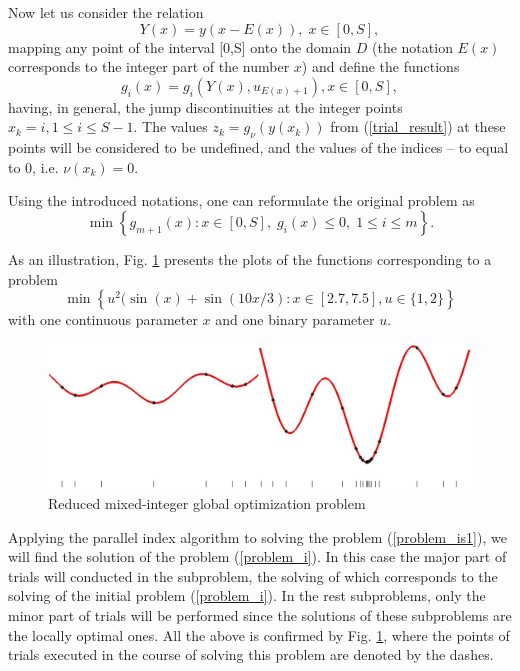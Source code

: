 \documentclass{llncs}
\begin{document}
Now let us consider the relation 
\[
Y(x)=y(x-E(x)), \; x\in[0,S],
\]
mapping any point of the interval [0,S] onto the domain $D$ (the notation $E(x)$ corresponds 
to the integer part of the number $x$) and define the functions 
\[
g_i(x) = g_i(Y(x),u_{E(x)+1}), x\in[0,S],
\]
having, in general, the jump discontinuities at the integer points $x_k = i, 1\leq i \leq 
S-1$.
The values $z_k = g_\nu(y(x_k))$ from (\ref{trial_result}) at these points will be considered to 
be undefined, and the values of the indices -- to equal to 0, i.e. $\nu(x_k) = 0$.

Using the introduced notations, one can reformulate the original problem as
\begin{equation}\label{problem_is1}
\min \left\{g_{m+1}(x): x \in [0,S], \; g_i(x) \leq 0, \; 1 \leq i \leq m\right\}.
\end{equation}

As an illustration, Fig. \ref{fig:1} presents the plots of the functions corresponding to a 
problem 
\[
\min{\left\{ u^2 (\sin(x) +\sin(10x/3) : x\in [2.7, 7.5], u \in \{1,2\} \right\}}
\]
with one continuous parameter $x$ and one binary parameter $u$.

\begin{figure}[ht]
    \centering
    \includegraphics[width=1.0\textwidth] {fig1.jpg}
    \caption{Reduced mixed-integer global optimization problem}
    \label{fig:1}
\end{figure}

Applying the parallel index algorithm to solving the problem (\ref{problem_is1}), we will find 
the solution of the problem (\ref{problem_i}). In this case the major part of trials will conducted 
in 
the subproblem, the solving of which corresponds to the solving of the initial 
problem (\ref{problem_i}). In the rest subproblems, only the minor part of trials will be 
performed 
since the solutions of these subproblems are the locally optimal ones.
All the above is confirmed by Fig. \ref{fig:1}, where the  
points of trials executed in the course of solving this problem are denoted by the dashes.
\end{document}
